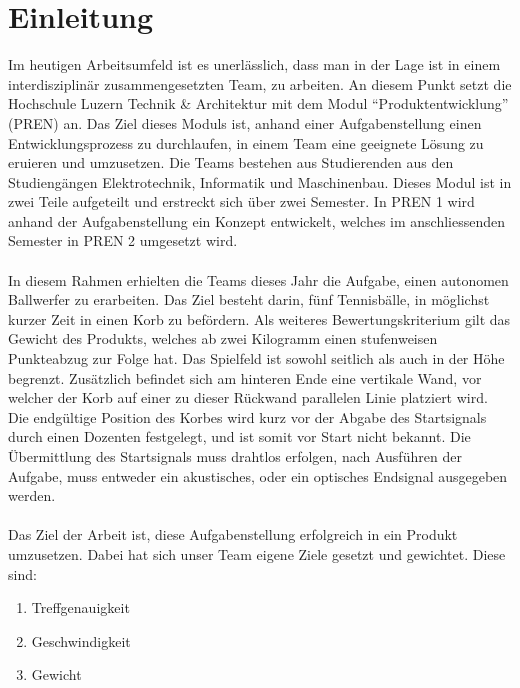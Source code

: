 \section{Einleitung}
Im heutigen Arbeitsumfeld ist es unerlässlich, dass man in der Lage ist in 
einem interdisziplinär zusammengesetzten Team, zu arbeiten. An diesem Punkt 
setzt die Hochschule Luzern Technik \& Architektur mit dem Modul 
\enquote{Produktentwicklung} (PREN) an. Das Ziel dieses Moduls ist, anhand 
einer Aufgabenstellung einen Entwicklungsprozess zu durchlaufen, in einem 
Team eine geeignete Lösung zu eruieren und umzusetzen. Die Teams bestehen 
aus Studierenden aus den Studiengängen Elektrotechnik, Informatik und 
Maschinenbau. Dieses Modul ist in zwei Teile aufgeteilt und erstreckt sich 
über zwei Semester. In PREN 1 wird anhand der Aufgabenstellung ein Konzept 
entwickelt, welches im anschliessenden Semester in PREN 2 umgesetzt wird.\\
\\
In diesem Rahmen erhielten die Teams dieses Jahr die Aufgabe, einen autonomen 
Ballwerfer zu erarbeiten. Das Ziel besteht darin, fünf Tennisbälle, in möglichst 
kurzer Zeit in einen Korb zu befördern. Als weiteres Bewertungskriterium gilt 
das Gewicht des Produkts, welches ab zwei Kilogramm einen stufenweisen 
Punkteabzug zur Folge hat. Das Spielfeld ist sowohl seitlich als auch in der 
Höhe begrenzt. Zusätzlich befindet sich am hinteren Ende eine vertikale Wand, 
vor welcher der Korb auf einer zu dieser Rückwand parallelen Linie platziert 
wird. Die endgültige Position des Korbes wird kurz vor der Abgabe des Startsignals 
durch einen Dozenten festgelegt, und ist somit vor Start nicht bekannt. Die 
Übermittlung des Startsignals muss drahtlos erfolgen, nach Ausführen der Aufgabe, 
muss entweder ein akustisches, oder ein optisches Endsignal ausgegeben werden.\\
\\
Das Ziel der Arbeit ist, diese Aufgabenstellung erfolgreich in ein Produkt 
umzusetzen. Dabei hat sich unser Team eigene Ziele gesetzt und gewichtet. 
Diese sind:
\begin{enumerate}
    \item Treffgenauigkeit
    \item Geschwindigkeit
    \item Gewicht
\end{enumerate}

\newpage